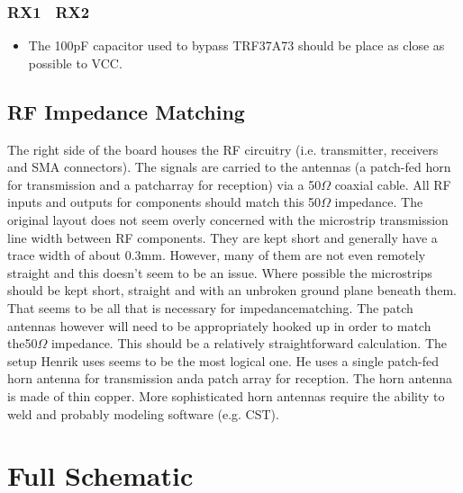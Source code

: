 \documentclass{default}
\begin{document}
\subsection{RX1 \ RX2}

\begin{itemize}
\item The 100pF capacitor used to bypass TRF37A73 should be place as close as possible to VCC.
\end{itemize}

\section{RF Impedance Matching}

The right side of the board houses the RF circuitry (i.e. transmitter, receivers and SMA
connectors). The signals are carried to the antennas (a patch-fed horn for transmission and a
patcharray for reception) via a 50$\si{\Omega}$ coaxial cable. All RF inputs and outputs for
components should match this 50$\si{\Omega}$ impedance. The original layout does not seem overly
concerned with the microstrip transmission line width between RF components. They are kept short and
generally have a trace width of about 0.3mm. However, many of them are not even remotely straight
and this doesn't seem to be an issue. Where possible the microstrips should be kept short, straight
and with an unbroken ground plane beneath them. That seems to be all that is necessary for
impedancematching. The patch antennas however will need to be appropriately hooked up in order to
match the50$\si{\Omega}$ impedance. This should be a relatively straightforward calculation. The
setup Henrik uses seems to be the most logical one. He uses a single patch-fed horn antenna for
transmission anda patch array for reception. The horn antenna is made of thin copper. More
sophisticated horn antennas require the ability to weld and probably modeling software (e.g. CST).

\chapter{Full Schematic}
\label{cha:schematic}


\end{document}
